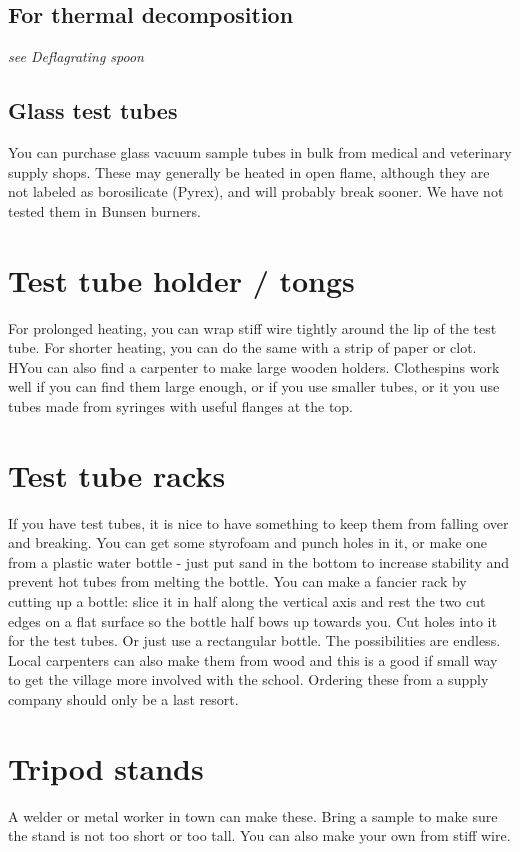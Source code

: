 \subsection{For thermal decomposition}
\textit{see Deflagrating spoon}

\subsection{Glass test tubes}
You can purchase glass vacuum sample tubes 
in bulk from medical and veterinary supply shops. 
These may generally be heated in open flame, 
although they are not labeled as borosilicate (Pyrex), 
and will probably break sooner. 
We have not tested them in Bunsen burners.

\section{Test tube holder / tongs}
For prolonged heating, 
you can wrap stiff wire tightly around the lip of the test tube. 
For shorter heating, 
you can do the same with a strip of paper or clot. 
HYou can also find a carpenter to make large wooden holders. 
Clothespins work well if you can find them large enough, 
or if you use smaller tubes, 
or it you use tubes made from syringes with useful flanges at the top.

\section{Test tube racks}
If you have test tubes, 
it is nice to have something to keep them from falling over and breaking. 
You can get some styrofoam and punch holes in it, 
or make one from a plastic water bottle - 
just put sand in the bottom to increase stability 
and prevent hot tubes from melting the bottle. 
You can make a fancier rack by cutting up a bottle: 
slice it in half along the vertical axis 
and rest the two cut edges on a flat surface 
so the bottle half bows up towards you. 
Cut holes into it for the test tubes. 
Or just use a rectangular bottle. 
The possibilities are endless. 
Local carpenters can also make them from wood 
and this is a good if small way 
to get the village more involved with the school. 
Ordering these from a supply company should only be a last resort. 

\section{Tripod stands}
A welder or metal worker in town can make these. 
Bring a sample to make sure the stand is not too short or too tall. 
You can also make your own from stiff wire.

